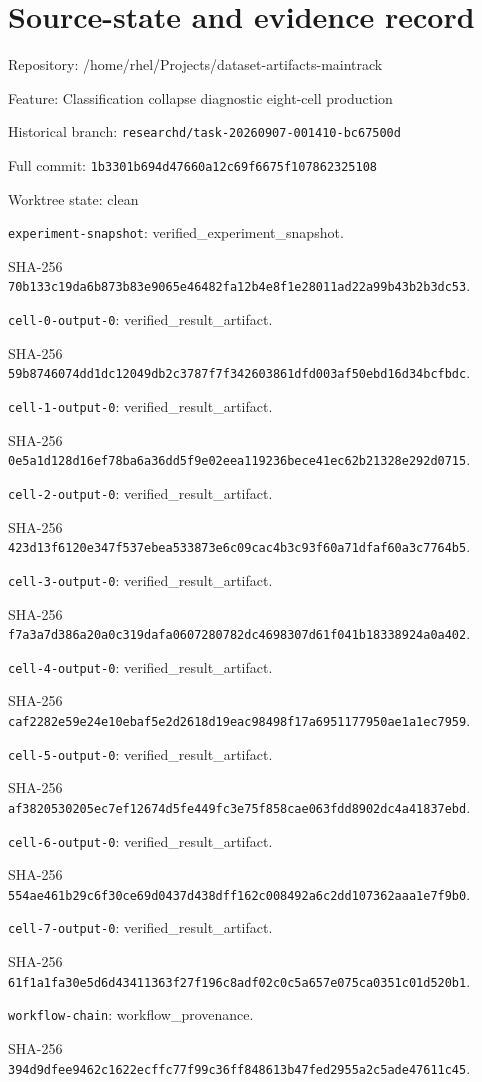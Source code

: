 \documentclass[10pt,twocolumn,letterpaper]{article}
\begin{document}
\section{Source-state and evidence record}
Repository: /home/rhel/Projects/dataset-artifacts-maintrack\par Feature: Classification collapse diagnostic eight-cell production\par Historical branch: \texttt{researchd/task-20260907-001410-bc67500d}\par Full commit: \texttt{1b3301b694d47660a12c69f6675f107862325108}\par Worktree state: clean\par

\noindent\texttt{experiment-snapshot}: verified\_experiment\_snapshot.\par\noindent SHA-256 \texttt{70b133c19da6b873b83e9065e46482fa}\allowbreak\texttt{12b4e8f1e28011ad22a99b43b2b3dc53}.\par
\noindent\texttt{cell-0-output-0}: verified\_result\_artifact.\par\noindent SHA-256 \texttt{59b8746074dd1dc12049db2c3787f7f3}\allowbreak\texttt{42603861dfd003af50ebd16d34bcfbdc}.\par
\noindent\texttt{cell-1-output-0}: verified\_result\_artifact.\par\noindent SHA-256 \texttt{0e5a1d128d16ef78ba6a36dd5f9e02ee}\allowbreak\texttt{a119236bece41ec62b21328e292d0715}.\par
\noindent\texttt{cell-2-output-0}: verified\_result\_artifact.\par\noindent SHA-256 \texttt{423d13f6120e347f537ebea533873e6c}\allowbreak\texttt{09cac4b3c93f60a71dfaf60a3c7764b5}.\par
\noindent\texttt{cell-3-output-0}: verified\_result\_artifact.\par\noindent SHA-256 \texttt{f7a3a7d386a20a0c319dafa060728078}\allowbreak\texttt{2dc4698307d61f041b18338924a0a402}.\par
\noindent\texttt{cell-4-output-0}: verified\_result\_artifact.\par\noindent SHA-256 \texttt{caf2282e59e24e10ebaf5e2d2618d19e}\allowbreak\texttt{ac98498f17a6951177950ae1a1ec7959}.\par
\noindent\texttt{cell-5-output-0}: verified\_result\_artifact.\par\noindent SHA-256 \texttt{af3820530205ec7ef12674d5fe449fc3}\allowbreak\texttt{e75f858cae063fdd8902dc4a41837ebd}.\par
\noindent\texttt{cell-6-output-0}: verified\_result\_artifact.\par\noindent SHA-256 \texttt{554ae461b29c6f30ce69d0437d438dff}\allowbreak\texttt{162c008492a6c2dd107362aaa1e7f9b0}.\par
\noindent\texttt{cell-7-output-0}: verified\_result\_artifact.\par\noindent SHA-256 \texttt{61f1a1fa30e5d6d43411363f27f196c8}\allowbreak\texttt{adf02c0c5a657e075ca0351c01d520b1}.\par
\noindent\texttt{workflow-chain}: workflow\_provenance.\par\noindent SHA-256 \texttt{394d9dfee9462c1622ecffc77f99c36f}\allowbreak\texttt{f848613b47fed2955a2c5ade47611c45}.\par
\end{document}
